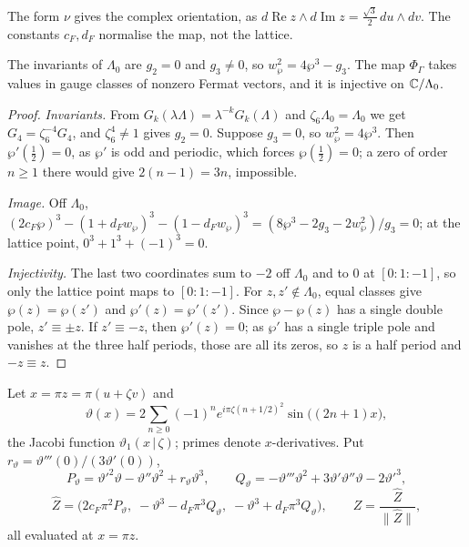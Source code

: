 The form $\nu$ gives the complex orientation, as $d\operatorname{Re}z\wedge d\operatorname{Im}z=\frac{\sqrt3}2\,du\wedge dv$. The constants $c_F,d_F$ normalise the map, not the lattice.

\begin{lemma}\label{lem:fer-torus}
The invariants of $\Lambda_0$ are $g_2=0$ and $g_3\ne0$, so $w_\wp^2=4\wp^3-g_3$. The map $\Phi_\Gamma$ takes values in gauge classes of nonzero Fermat vectors, and it is injective on $\mathbb{C}/\Lambda_0$.
\end{lemma}

\begin{proof}
\emph{Invariants.} From $G_k(\lambda\Lambda)=\lambda^{-k}G_k(\Lambda)$ and $\zeta_6\Lambda_0=\Lambda_0$ we get $G_4=\zeta_6^{-4}G_4$, and $\zeta_6^4\ne1$ gives $g_2=0$. Suppose $g_3=0$, so $w_\wp^2=4\wp^3$. Then $\wp'(\frac12)=0$, as $\wp'$ is odd and periodic, which forces $\wp(\frac12)=0$; a zero of order $n\ge1$ there would give $2(n-1)=3n$, impossible.

\emph{Image.} Off $\Lambda_0$, $(2c_F\wp)^3-(1+d_Fw_\wp)^3-(1-d_Fw_\wp)^3=(8\wp^3-2g_3-2w_\wp^2)/g_3=0$; at the lattice point, $0^3+1^3+(-1)^3=0$.

\emph{Injectivity.} The last two coordinates sum to $-2$ off $\Lambda_0$ and to $0$ at $[0:1:-1]$, so only the lattice point maps to $[0:1:-1]$. For $z,z'\notin\Lambda_0$, equal classes give $\wp(z)=\wp(z')$ and $\wp'(z)=\wp'(z')$. Since $\wp-\wp(z)$ has a single double pole, $z'\equiv\pm z$. If $z'\equiv-z$, then $\wp'(z)=0$; as $\wp'$ has a single triple pole and vanishes at the three half periods, those are all its zeros, so $z$ is a half period and $-z\equiv z$.
\end{proof}

\begin{definition}\label{def:fer-theta}
Let $x=\pi z=\pi(u+\zeta v)$ and
\[
 \vartheta(x)=2\sum_{n\ge0}(-1)^ne^{i\pi\zeta(n+1/2)^2}\sin\big((2n+1)x\big),
\]
the Jacobi function $\vartheta_1(x\,|\,\zeta)$; primes denote $x$-derivatives. Put
$r_\vartheta=\vartheta'''(0)/(3\vartheta'(0))$,
\[
 P_\vartheta=\vartheta'^2\vartheta-\vartheta''\vartheta^2+r_\vartheta\vartheta^3,\qquad
 Q_\vartheta=-\vartheta'''\vartheta^2+3\vartheta'\vartheta''\vartheta-2\vartheta'^3,
\]
\[
 \hat Z=\big(2c_F\pi^2P_\vartheta,\;-\vartheta^3-d_F\pi^3Q_\vartheta,\;-\vartheta^3+d_F\pi^3Q_\vartheta\big),\qquad
 Z=\frac{\hat Z}{\|\hat Z\|},
\]
all evaluated at $x=\pi z$.
\end{definition}

